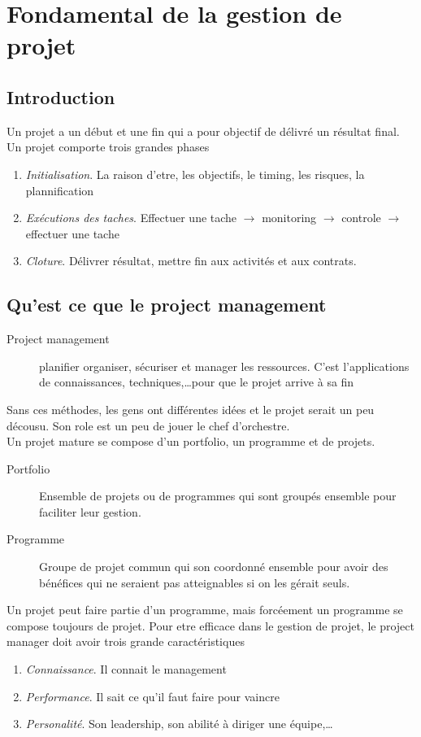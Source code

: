 \chapter{Fondamental de la gestion de projet}
\section{Introduction}
Un projet a un début et une fin qui a pour objectif de délivré un résultat final.  Un projet comporte trois
grandes phases
\begin{enumerate}
\item \textit{Initialisation}. La raison d'etre, les objectifs, le timing, les risques, la plannification
\item \textit{Exécutions des taches}. Effectuer une tache $\to$ monitoring $\to$ controle $\to$ effectuer une 
tache
\item \textit{Cloture}. Délivrer résultat, mettre fin aux activités et aux contrats.
\end{enumerate}

\section{Qu'est ce que le project management}
\begin{description}
\item[Project management] planifier organiser, sécuriser et manager les ressources. C'est l'applications de 
connaissances, techniques,\dots pour que le projet arrive à sa fin
\end{description}
Sans ces méthodes, les gens ont différentes idées et le projet serait un peu décousu. Son role est un peu 
de jouer le chef d'orchestre. \\

Un projet mature se compose d'un portfolio, un programme et de projets. 
\begin{description}
\item[Portfolio] Ensemble de projets ou de programmes qui sont groupés ensemble pour faciliter leur 
gestion.
\item[Programme] Groupe de projet commun qui son coordonné ensemble pour avoir des bénéfices qui ne seraient 
pas atteignables si on les gérait seuls.
\end{description}
Un projet peut faire partie d'un programme, mais forcéement un programme se compose toujours de projet. Pour 
etre efficace dans le gestion de projet, le project manager doit avoir trois grande caractéristiques
\begin{enumerate}
\item \textit{Connaissance}. Il connait le management
\item \textit{Performance}. Il sait ce qu'il faut faire pour vaincre
\item \textit{Personalité}. Son leadership, son abilité à diriger une équipe,\dots
\end{enumerate}

